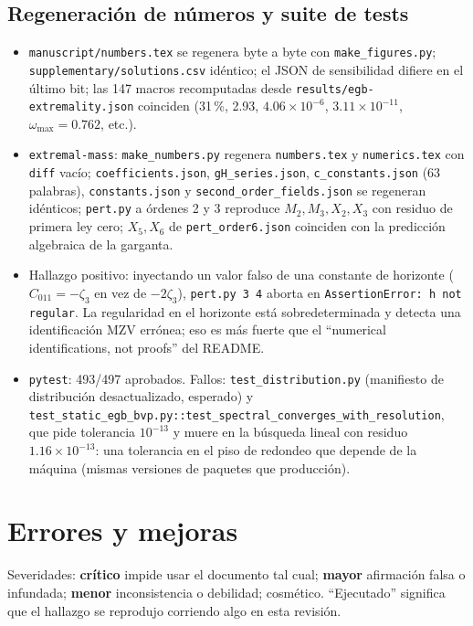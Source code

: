 \documentclass[10pt,a4paper]{article}
\newcommand{\CRIT}{\textcolor{crit}{\textbf{crítico}}}
\newcommand{\MAY}{\textcolor{may}{\textbf{mayor}}}
\newcommand{\MEN}{\textbf{menor}}
\newcommand{\COS}{cosmético}
\newcommand{\code}[1]{\texttt{#1}}
\begin{document}
\subsection{Regeneración de números y suite de tests}
\begin{itemize}
\item \code{manuscript/numbers.tex} se regenera byte a byte con \code{make\_figures.py};
 \code{supplementary/solutions.csv} idéntico; el JSON de sensibilidad difiere en el último bit;
 las 147 macros recomputadas desde \code{results/egb-extremality.json} coinciden (31\,\%, 2.93,
 $4.06\times10^{-6}$, $3.11\times10^{-11}$, $\omega_{\max}=0.762$, etc.).
\item \code{extremal-mass}: \code{make\_numbers.py} regenera \code{numbers.tex} y \code{numerics.tex}
 con \code{diff} vacío; \code{coefficients.json}, \code{gH\_series.json}, \code{c\_constants.json}
 (63 palabras), \code{constants.json} y \code{second\_order\_fields.json} se regeneran idénticos;
 \code{pert.py} a órdenes 2 y 3 reproduce $M_2,M_3,X_2,X_3$ con residuo de primera ley cero;
 $X_5,X_6$ de \code{pert\_order6.json} coinciden con la predicción algebraica de la garganta.
\item Hallazgo positivo: inyectando un valor falso de una constante de horizonte ($C_{011}=-\zeta_3$
 en vez de $-2\zeta_3$), \code{pert.py 3 4} aborta en \code{AssertionError: h not regular}. La
 regularidad en el horizonte está sobredeterminada y detecta una identificación MZV errónea; eso es
 más fuerte que el ``numerical identifications, not proofs'' del README.
\item \code{pytest}: 493/497 aprobados. Fallos: \code{test\_distribution.py} (manifiesto de
 distribución desactualizado, esperado) y
 \code{test\_static\_egb\_bvp.py::test\_spectral\_converges\_with\_resolution}, que pide tolerancia
 $10^{-13}$ y muere en la búsqueda lineal con residuo $1.16\times10^{-13}$: una tolerancia en el
 piso de redondeo que depende de la máquina (mismas versiones de paquetes que producción).
\end{itemize}

\section{Errores y mejoras}
\label{sec:errores}

Severidades: \CRIT{} impide usar el documento tal cual; \MAY{} afirmación falsa o
infundada; \MEN{} inconsistencia o debilidad; \COS{}. ``Ejecutado'' significa que el hallazgo se
reprodujo corriendo algo en esta revisión.
\end{document}
